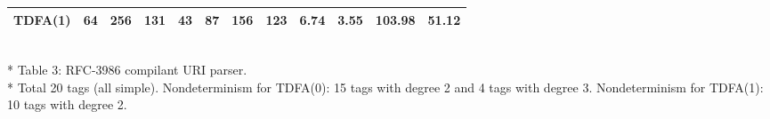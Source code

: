 \documentclass{article}
\theoremstyle{definition}
\begin{document}
\begin{center}
\begin{tabular}{|c|ccccccccccc|}
    TDFA(1) &  64 & 256 & 131 &  43 &  87 & 156 & 123 &  6.74 & 3.55 & 103.98 & 51.12 \\
    \hline
    \end{tabular}\\*
    \medskip
    Table 3: RFC-3986 compilant URI parser.\\*
    \medskip
    \footnotesize{Total 20 tags (all simple).
    Nondeterminism for TDFA(0): 15 tags with degree 2 and 4 tags with degree 3.
    Nondeterminism for TDFA(1): 10 tags with degree 2.}
    \bigskip
\end{center}
\end{document}
